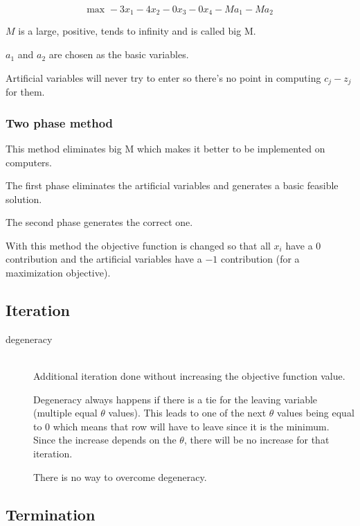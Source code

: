 \documentclass[a4paper, 12pt]{article}
\begin{document}
\begin{equation*}
    \text{max } -3x_1 - 4x_2 - 0x_3 - 0x_4 - Ma_1 - Ma_2
\end{equation*}

$M$ is a large, positive, tends to infinity and is called big M.

$a_1$ and $a_2$ are chosen as the basic variables.

Artificial variables will never try to enter so there's no point in computing
$c_j-z_j$ for them.

\subsubsection{Two phase method}

This method eliminates big M which makes it better to be implemented on
computers.

The first phase eliminates the artificial variables and generates a basic
feasible solution.

The second phase generates the correct one.

With this method the objective function is changed so that all $x_i$ have a 0
contribution and the artificial variables have a $-1$ contribution (for a
maximization objective).

\subsection{Iteration}

\begin{description}

\item[degeneracy] \hfill \\
    Additional iteration done without increasing the objective function value.
    
    Degeneracy always happens if there is a tie for the leaving variable
    (multiple equal $\theta$ values). This leads to one of the next $\theta$
    values being equal to 0 which means that row will have to leave since it is
    the minimum. Since the increase depends on the $\theta$, there will be no
    increase for that iteration.
    
    There is no way to overcome degeneracy.

\end{description}

\subsection{Termination}
\end{document}
